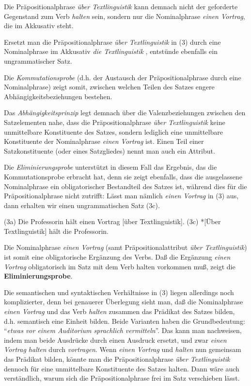 \documentclass[
  letterpaper,
  DIV=11,
  numbers=noendperiod]{scrreprt}
\begin{document}
Die Präpositionalphrase \emph{über Textlinguistik} kann demnach nicht
der geforderte Gegenstand zum Verb \emph{halten} sein, sondern nur die
Nominalphrase \emph{einen Vortrag}, die im Akkusativ steht.

Ersetzt man die Präpositionalphrase \emph{über Textlinguistik} in (3)
durch eine Nominalphrase im Akkusativ \emph{die Textlinguistik} ,
entstünde ebenfalls ein ungrammatischer Satz.

Die \emph{Kommutationsprobe} (d.h. der Austausch der Präpositionalphrase
durch eine Nominalphrase) zeigt somit, zwischen welchen Teilen des
Satzes engere Abhängigkeitsbeziehungen bestehen.

Das \emph{Abhängigkeitsprinzip} legt demnach über die Valenzbeziehungen
zwischen den Satzelementen nahe, dass die Präpositionalphrase \emph{über
Textlinguistik} keine unmittelbare Konstituente des Satzes, sondern
lediglich eine unmittelbare Konstituente der Nominalphrase \emph{einen
Vortrag} ist. Einen Teil einer Satzkonstituente (oder eines Satzgliedes)
nennt man auch ein Attribut.

Die \emph{Eliminierungsprobe} unterstützt in diesem Fall das Ergebnis,
das die Kommutationsprobe erbracht hat, denn sie zeigt ebenfalls, dass
die ausgelassene Nominalphrase ein obligatorischer Bestandteil des
Satzes ist, während dies für die Präpositionalphrase nicht zutrifft:
Lässt man nämlich \emph{einen Vortrag} in (3) aus, dann erhalten wir
einen ungrammatischen Satz (3c).

(3a) Die Professorin hält einen Vortrag {[}über Textlinguistik{]}. (3c)
*{[}Über Textlinguistik{]} hält die Professorin.

Die Nominalphrase \emph{einen Vortrag} (samt Präpositionalattribut
\emph{über Textlinguistik}) ist somit eine obligatorische Ergänzung des
Verbs. Daß die Ergänzung \emph{einen Vortrag} obligatorisch im Satz mit
dem Verb halten vorkommen muß, zeigt die \textbf{Eliminierungsprobe}.

Die semantischen und syntaktischen Verhältnisse in (3) liegen allerdings
noch komplizierter, denn bei genauerer Überlegung sieht man, daß die
Nominalphrase \emph{einen Vortrag} und das Verb \emph{halten} zusammen
das Prädikat des Satzes bilden, d.h. semantisch eine Einheit bilden.
Beide Varianten haben die Grundbedeutung: ``\emph{etwas vor einem
Auditorium sprachlich vermitteln}''. Das kann man nachweisen, indem man
beide Ausdrücke durch einen Ausdruck ersetzt, und zwar \emph{einen
Vortrag halten} durch \emph{vortragen}. Wenn \emph{einen Vortrag} und
\emph{halten} nun gemeinsam das Prädikat bilden, könnte man die
Präpositionalphrase \emph{über Textlinguistik} dennoch für eine
unmittelbare Konstituente des Satzes halten. Dann wäre auch
verständlich, warum sich die Präpositionalphrase frei im Satz
verschieben lässt.
\end{document}
